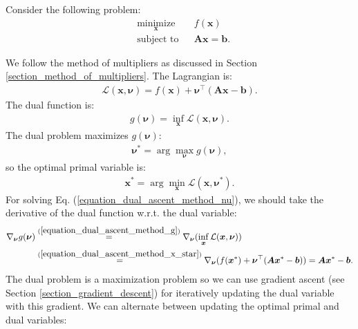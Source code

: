 \documentclass[lang=cn,10pt]{gorgeousnbook}
\numberwithin{equation}{section}%
\numberwithin{figure}{section}%
\begin{document}
Consider the following problem:
\begin{equation}\label{equation_dual_ascent_method_optimization_problem}
\begin{aligned}
& \underset{\boldsymbol{x}}{\text{minimize}}
& & f(\boldsymbol{x}) \\
& \text{subject to}
& & \boldsymbol{A} \boldsymbol{x} = \boldsymbol{b}.
\end{aligned}
\end{equation}

We follow the method of multipliers as discussed in Section \ref{section_method_of_multipliers}.
The Lagrangian is:
\begin{align*}
\mathcal{L}(\boldsymbol{x}, \boldsymbol{\nu}) = f(\boldsymbol{x}) + \boldsymbol{\nu}^\top (\boldsymbol{A} \boldsymbol{x} - \boldsymbol{b}).
\end{align*}
The dual function is:
\begin{align}\label{equation_dual_ascent_method_g}
g(\boldsymbol{\nu}) = \inf_{\boldsymbol{x}} \mathcal{L}(\boldsymbol{x}, \boldsymbol{\nu}).
\end{align}
The dual problem maximizes $g(\boldsymbol{\nu})$:
\begin{align}\label{equation_dual_ascent_method_nu}
\boldsymbol{\nu}^* = \arg \max_{\boldsymbol{\nu}} g(\boldsymbol{\nu}),
\end{align}
so the optimal primal variable is:
\begin{align}\label{equation_dual_ascent_method_x_star}
\boldsymbol{x}^* = \arg \min_{\boldsymbol{x}} \mathcal{L}(\boldsymbol{x}, \boldsymbol{\nu}^*).
\end{align}
For solving Eq. (\ref{equation_dual_ascent_method_nu}), we should take the derivative of the dual function w.r.t. the dual variable:
\begin{align*}
\nabla_{\boldsymbol{\nu}} g(\boldsymbol{\nu}) &\overset{(\ref{equation_dual_ascent_method_g})}{=} \nabla_{\boldsymbol{\nu}}(\inf_{\boldsymbol{x}} \mathcal{L}(\boldsymbol{x}, \boldsymbol{\nu})) \\
&\overset{(\ref{equation_dual_ascent_method_x_star})}{=} \nabla_{\boldsymbol{\nu}}(f(\boldsymbol{x}^*) + \boldsymbol{\nu}^\top (\boldsymbol{A} \boldsymbol{x}^* - \boldsymbol{b})) = \boldsymbol{A} \boldsymbol{x}^* - \boldsymbol{b}.
\end{align*}
The dual problem is a maximization problem so we can use gradient ascent (see Section \ref{section_gradient_descent}) for iteratively updating the dual variable with this gradient. We can alternate between updating the optimal primal and dual variables:
\end{document}
